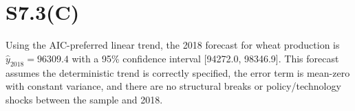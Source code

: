 \section*{S7.3(C)}
Using the AIC-preferred linear trend, the 2018 forecast for wheat production is 
$\hat{y}_{2018} = 96309.4$ with a 95\% confidence interval 
[94272.0, 98346.9]. 
This forecast assumes the deterministic trend is correctly specified, the error term is mean-zero with constant variance, 
and there are no structural breaks or policy/technology shocks between the sample and 2018.
